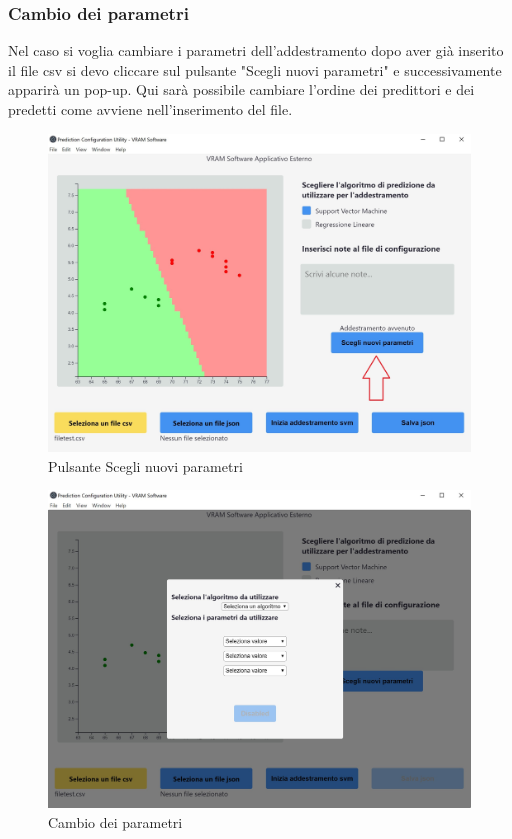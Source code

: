 		\subsubsection{Cambio dei parametri}
		Nel caso si voglia cambiare i parametri dell'addestramento dopo aver già inserito il file csv si devo cliccare sul pulsante "Scegli nuovi parametri" e successivamente apparirà un pop-up. Qui sarà possibile cambiare l'ordine dei predittori e dei predetti come avviene nell'inserimento del file.
		\mbox{}
		\begin{figure} [H]
			\begin{center}
				\includegraphics[width=112mm]{./img/4-1.jpg}
			\end{center}
			\caption{Pulsante Scegli nuovi parametri}
		\end{figure}
		\mbox{}
		\mbox{}
		\begin{figure} [H]
			\begin{center}
				\includegraphics[width=112mm]{./img/3.jpg}
			\end{center}
			\caption{Cambio dei parametri}
		\end{figure}
		\mbox{}
